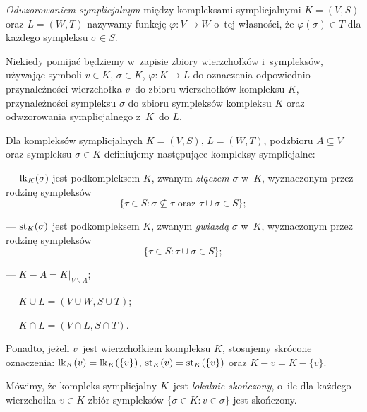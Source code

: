 \textit{Odwzorowaniem symplicjalnym} między kompleksami symplicjalnymi $K=(V,S)$ oraz $L=(W,T)$ nazywamy funkcję $\varphi\colon V\to W$ o~tej własności, że $\varphi(\sigma)\in T$ dla każdego sympleksu $\sigma\in S$.

Niekiedy pomijać będziemy w~zapisie zbiory wierzchołków i~sympleksów, używając symboli $v\in K$, $\sigma\in K$, $\varphi\colon K\to L$ do oznaczenia odpowiednio przynależności wierzchołka $v$~do zbioru wierzchołków kompleksu $K$, przynależności sympleksu $\sigma$ do zbioru sympleksów kompleksu $K$ oraz odwzorowania symplicjalnego z~$K$~do $L$.

Dla kompleksów symplicjalnych $K=(V,S)$, $L=(W,T)$, podzbioru $A\subseteq V$ oraz sympleksu $\sigma\in K$ definiujemy następujące kompleksy symplicjalne:
\begin{compactitem}
\item[---] $\operatorname{lk}_K(\sigma)$ jest podkompleksem $K$, zwanym \textit{złączem} $\sigma$ w~$K$, wyznaczonym przez rodzinę sympleksów  \[\{\tau\in S: \sigma\not\subseteq\tau \text{ oraz } \tau\cup\sigma\in S\};\]
\item[---] $\operatorname{st}_K(\sigma)$ jest podkompleksem $K$, zwanym \textit{gwiazdą} $\sigma$ w~$K$, wyznaczonym przez rodzinę sympleksów \[\{\tau\in S: \tau\cup\sigma\in S\};\]
\item[---] $K-A=K\big|_{V\smallsetminus A}$;
\item[---] $K\cup L=(V\cup W, S\cup T)$;
\item[---] $K\cap L=(V\cap L, S\cap T)$.
\end{compactitem}
Ponadto, jeżeli $v$~jest wierzchołkiem kompleksu $K$, stosujemy skrócone oznaczenia: $\operatorname{lk}_K(v)=\operatorname{lk}_K(\{v\})$, $\operatorname{st}_K(v)=\operatorname{st}_K(\{v\})$ oraz $K-v=K-\{v\}$.

Mówimy, że kompleks symplicjalny $K$~jest \textit{lokalnie skończony}, o~ile dla każdego wierzchołka $v\in K$ zbiór sympleksów $\{\sigma\in K:v\in\sigma\}$ jest skończony.

